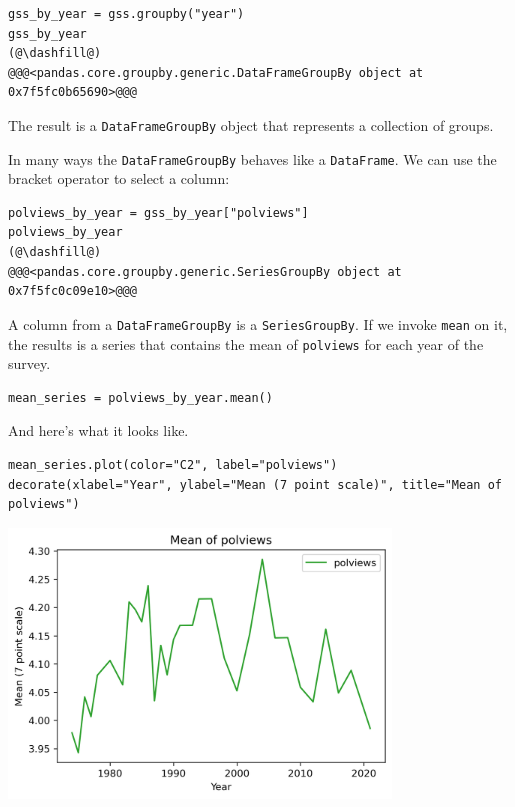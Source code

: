 \begin{lstlisting}[]
gss_by_year = gss.groupby("year")
gss_by_year
(@\dashfill@)
@@@<pandas.core.groupby.generic.DataFrameGroupBy object at 0x7f5fc0b65690>@@@
\end{lstlisting}

The result is a \passthrough{\lstinline!DataFrameGroupBy!} object that
represents a collection of groups.

In many ways the \passthrough{\lstinline!DataFrameGroupBy!} behaves like
a \passthrough{\lstinline!DataFrame!}. We can use the bracket operator
to select a column:

\begin{lstlisting}[]
polviews_by_year = gss_by_year["polviews"]
polviews_by_year
(@\dashfill@)
@@@<pandas.core.groupby.generic.SeriesGroupBy object at 0x7f5fc0c09e10>@@@
\end{lstlisting}

A column from a \passthrough{\lstinline!DataFrameGroupBy!} is a
\passthrough{\lstinline!SeriesGroupBy!}. If we invoke
\passthrough{\lstinline!mean!} on it, the results is a series that
contains the mean of \passthrough{\lstinline!polviews!} for each year of
the survey.

\begin{lstlisting}[]
mean_series = polviews_by_year.mean()
\end{lstlisting}

And here's what it looks like.

\begin{lstlisting}[]
mean_series.plot(color="C2", label="polviews")
decorate(xlabel="Year", ylabel="Mean (7 point scale)", title="Mean of polviews")
\end{lstlisting}

\begin{center}
\includegraphics[width=4in]{chapters/02_polviews_soln_files/02_polviews_soln_50_0.png}
\end{center}

